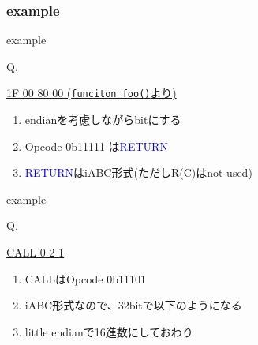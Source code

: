 \subsubsection{example}
\begin{frame}[fragile]{example}
	\begin{center}
		Q. 

		\underline{1F 00 80 00 (\lstinline|funciton foo()|より)}
	\end{center}
	\begin{enumerate}
		\item<2-> endianを考慮しながらbitにする

			\begin{center}

			\end{center}
		\item<6-> Opcode 0b11111 は\textcolor{blue}{RETURN}
		\item<7-> \textcolor{blue}{RETURN}はiABC形式(ただしR(C)はnot used)
	\end{enumerate}
	\begin{center}
	\end{center}
\end{frame}
\begin{frame}[fragile]{example}
	\begin{center}
		Q. 

		\underline{CALL 0 2 1}
	\end{center}
	\begin{enumerate}
		\item<2-> CALLはOpcode 0b11101
		\item<3-> iABC形式なので、32bitで以下のようになる

			\begin{center}
				\textcolor{orange}{}%
				\textcolor{green}{}%
				\textcolor{orange}{}%
				\textcolor{blue}{}%
			\end{center}
		\item<4-> little endianで16進数にしておわり
	\end{enumerate}
	\begin{center}
	\end{center}
\end{frame}
